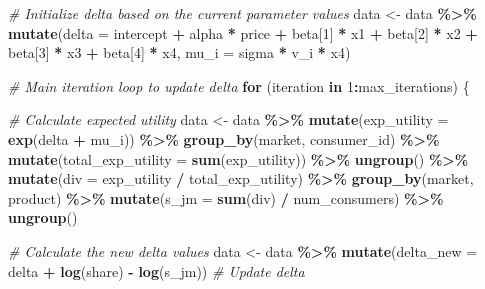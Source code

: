 \documentclass[
]{article}
\newenvironment{Shaded}{\begin{snugshade}}{\end{snugshade}}
\newcommand{\AttributeTok}[1]{\textcolor[rgb]{0.13,0.29,0.53}{#1}}
\newcommand{\CommentTok}[1]{\textcolor[rgb]{0.56,0.35,0.01}{\textit{#1}}}
\newcommand{\ControlFlowTok}[1]{\textcolor[rgb]{0.13,0.29,0.53}{\textbf{#1}}}
\newcommand{\DecValTok}[1]{\textcolor[rgb]{0.00,0.00,0.81}{#1}}
\newcommand{\FunctionTok}[1]{\textcolor[rgb]{0.13,0.29,0.53}{\textbf{#1}}}
\newcommand{\NormalTok}[1]{#1}
\newcommand{\OtherTok}[1]{\textcolor[rgb]{0.56,0.35,0.01}{#1}}
\newcommand{\SpecialCharTok}[1]{\textcolor[rgb]{0.81,0.36,0.00}{\textbf{#1}}}
\begin{document}
\begin{Shaded}
\begin{Highlighting}[]
  \CommentTok{\# Initialize delta based on the current parameter values}
\NormalTok{  data }\OtherTok{\textless{}{-}}\NormalTok{ data }\SpecialCharTok{\%\textgreater{}\%}
    \FunctionTok{mutate}\NormalTok{(}\AttributeTok{delta =}\NormalTok{ intercept }\SpecialCharTok{+}\NormalTok{ alpha }\SpecialCharTok{*}\NormalTok{ price }\SpecialCharTok{+}\NormalTok{ beta[}\DecValTok{1}\NormalTok{] }\SpecialCharTok{*}\NormalTok{ x1 }\SpecialCharTok{+}\NormalTok{ beta[}\DecValTok{2}\NormalTok{] }\SpecialCharTok{*}\NormalTok{ x2 }\SpecialCharTok{+}\NormalTok{ beta[}\DecValTok{3}\NormalTok{] }\SpecialCharTok{*}\NormalTok{ x3 }\SpecialCharTok{+}\NormalTok{ beta[}\DecValTok{4}\NormalTok{] }\SpecialCharTok{*}\NormalTok{ x4,}
           \AttributeTok{mu\_i =}\NormalTok{ sigma }\SpecialCharTok{*}\NormalTok{ v\_i }\SpecialCharTok{*}\NormalTok{ x4)}
  
  \CommentTok{\# Main iteration loop to update delta}
  \ControlFlowTok{for}\NormalTok{ (iteration }\ControlFlowTok{in} \DecValTok{1}\SpecialCharTok{:}\NormalTok{max\_iterations) \{}
    
    \CommentTok{\# Calculate expected utility}
\NormalTok{    data }\OtherTok{\textless{}{-}}\NormalTok{ data }\SpecialCharTok{\%\textgreater{}\%}
      \FunctionTok{mutate}\NormalTok{(}\AttributeTok{exp\_utility =} \FunctionTok{exp}\NormalTok{(delta }\SpecialCharTok{+}\NormalTok{ mu\_i)) }\SpecialCharTok{\%\textgreater{}\%}
      \FunctionTok{group\_by}\NormalTok{(market, consumer\_id) }\SpecialCharTok{\%\textgreater{}\%}
      \FunctionTok{mutate}\NormalTok{(}\AttributeTok{total\_exp\_utility =} \FunctionTok{sum}\NormalTok{(exp\_utility)) }\SpecialCharTok{\%\textgreater{}\%}
      \FunctionTok{ungroup}\NormalTok{() }\SpecialCharTok{\%\textgreater{}\%}
      \FunctionTok{mutate}\NormalTok{(}\AttributeTok{div =}\NormalTok{ exp\_utility }\SpecialCharTok{/}\NormalTok{ total\_exp\_utility) }\SpecialCharTok{\%\textgreater{}\%}
      \FunctionTok{group\_by}\NormalTok{(market, product) }\SpecialCharTok{\%\textgreater{}\%}
      \FunctionTok{mutate}\NormalTok{(}\AttributeTok{s\_jm =} \FunctionTok{sum}\NormalTok{(div) }\SpecialCharTok{/}\NormalTok{ num\_consumers) }\SpecialCharTok{\%\textgreater{}\%}
      \FunctionTok{ungroup}\NormalTok{()}
    
    \CommentTok{\# Calculate the new delta values}
\NormalTok{    data }\OtherTok{\textless{}{-}}\NormalTok{ data }\SpecialCharTok{\%\textgreater{}\%}
      \FunctionTok{mutate}\NormalTok{(}\AttributeTok{delta\_new =}\NormalTok{ delta }\SpecialCharTok{+} \FunctionTok{log}\NormalTok{(share) }\SpecialCharTok{{-}} \FunctionTok{log}\NormalTok{(s\_jm))  }\CommentTok{\# Update delta}
    

\end{Highlighting}
\end{Shaded}
\end{document}
